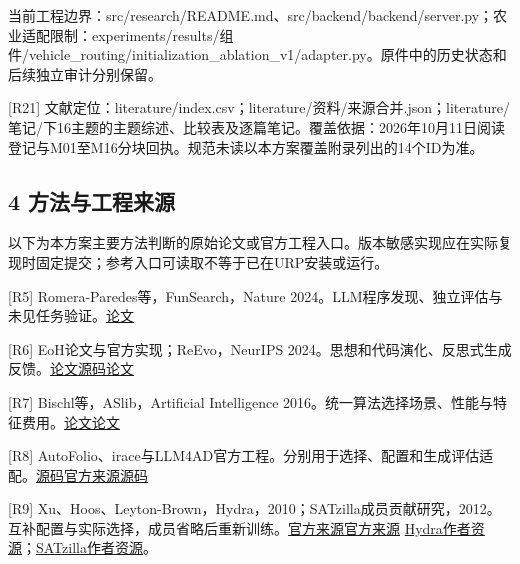 \documentclass[11pt,a4paper]{article}
\newcommand{\bodytext}[1]{#1\par}
\begin{document}
\bodytext{当前工程边界：src/\allowbreak{}research/\allowbreak{}README.md、src/\allowbreak{}backend/\allowbreak{}backend/\allowbreak{}server.py；农业适配限制：experiments/\allowbreak{}results/\allowbreak{}组件/\allowbreak{}vehicle\_\allowbreak{}routing/\allowbreak{}initialization\_\allowbreak{}ablation\_\allowbreak{}v1/\allowbreak{}adapter.py。原件中的历史状态和后续独立审计分别保留。}
\bodytext{[R21] 文献定位：literature/\allowbreak{}index.csv；literature/\allowbreak{}资料/\allowbreak{}来源合并.json；literature/\allowbreak{}笔记/\allowbreak{}下16主题的主题综述、比较表及逐篇笔记。覆盖依据：2026年10月11日阅读登记与M01至M16分块回执。规范未读以本方案覆盖附录列出的14个ID为准。}
\subsection{4  方法与工程来源}
\bodytext{以下为本方案主要方法判断的原始论文或官方工程入口。版本敏感实现应在实际复现时固定提交；参考入口可读取不等于已在URP安装或运行。}
\bodytext{[R5] Romera-Paredes等，FunSearch，Nature 2024。LLM程序发现、独立评估与未见任务验证。\newline \href{https://doi.org/10.1038/s41586-023-06924-6}{论文}}
\bodytext{[R6] EoH论文与官方实现；ReEvo，NeurIPS 2024。思想和代码演化、反思式生成反馈。\newline \href{https://arxiv.org/abs/2401.02051}{论文}\newline \href{https://github.com/FeiLiu36/EoH}{源码}\newline \href{https://proceedings.neurips.cc/paper\_files/paper/2024/hash/4ced59d480e07d290b6f29fc8798f195-Abstract-Conference.html}{论文}}
\bodytext{[R7] Bischl等，ASlib，Artificial Intelligence 2016。统一算法选择场景、性能与特征费用。\newline \href{https://doi.org/10.1016/j.artint.2016.04.003}{论文}\newline \href{https://arxiv.org/html/1506.02465v3}{论文}}
\bodytext{[R8] AutoFolio、irace与LLM4AD官方工程。分别用于选择、配置和生成评估适配。\newline \href{https://github.com/automl/AutoFolio}{源码}\newline \href{https://mlopez-ibanez.github.io/irace/}{官方来源}\newline \href{https://github.com/Optima-CityU/LLM4AD}{源码}}
\bodytext{[R9] Xu、Hoos、Leyton-Brown，Hydra，2010；SATzilla成员贡献研究，2012。互补配置与实际选择，成员省略后重新训练。\newline \href{https://www.cs.ubc.ca/~hoos/Publ/XuEtAl10.pdf}{官方来源}\newline \href{https://www.cs.ubc.ca/~kevinlb/papers/2012-SAT-EvaluatingSolverContributions.pdf}{官方来源} \href{https://www.cs.ubc.ca/labs/algorithms/Projects/Hydra/}{Hydra作者资源}；\href{https://www.cs.ubc.ca/labs/algorithms/Projects/SATzilla/}{SATzilla作者资源}。}
\end{document}

